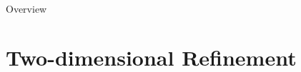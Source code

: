 \documentclass[aspectratio=1610,mathserif]{beamer}
\begin{document}
\begin{frame}{Overview}
\tableofcontents
\end{frame}

\section{Two-dimensional Refinement}

\end{document}
